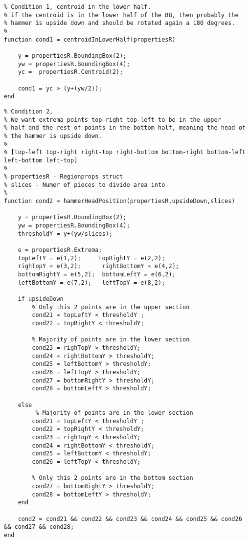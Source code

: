 \documentclass[es,gi]{ifirak}\usepackage[]{graphicx}\usepackage[]{color}
\begin{document}
\begin{lstlisting}
% Condition 1, centroid in the lower half.
% if the centroid is in the lower half of the BB, then probably the
% hammer is upside down and should be rotated again a 180 degrees.
%
function cond1 = centroidInLowerHalf(propertiesR)

    y = propertiesR.BoundingBox(2);
    yw = propertiesR.BoundingBox(4);
    yc =  propertiesR.Centroid(2);
    
    cond1 = yc > (y+(yw/2));
end

\end{lstlisting}

\begin{lstlisting}
% Condition 2,
% We want extrema points top-right top-left to be in the upper
% half and the rest of points in the bottom half, meaning the head of
% the hammer is upside down.
%
% [top-left top-right right-top right-bottom bottom-right bottom-left left-bottom left-top]
% 
% propertiesR - Regionprops struct
% slices - Numer of pieces to divide area into
% 
function cond2 = hammerHeadPosition(propertiesR,upsideDown,slices)
    
    y = propertiesR.BoundingBox(2);
    yw = propertiesR.BoundingBox(4);
    thresholdY = y+(yw/slices);
    
    e = propertiesR.Extrema;
    topLeftY = e(1,2);     topRightY = e(2,2);
    righTopY = e(3,2);      rightBottomY = e(4,2);
    bottomRightY = e(5,2);  bottomLeftY = e(6,2);
    leftBottomY = e(7,2);   leftTopY = e(8,2);
    
    if upsideDown
        % Only this 2 points are in the upper section
        cond21 = topLeftY < thresholdY ;
        cond22 = topRightY < thresholdY;

        % Majority of points are in the lower section
        cond23 = righTopY > thresholdY;
        cond24 = rightBottomY > thresholdY;
        cond25 = leftBottomY > thresholdY;
        cond26 = leftTopY > thresholdY;
        cond27 = bottomRightY > thresholdY;
        cond28 = bottomLeftY > thresholdY;
    
    else
         % Majority of points are in the lower section
        cond21 = topLeftY < thresholdY ;
        cond22 = topRightY < thresholdY;
        cond23 = righTopY < thresholdY;
        cond24 = rightBottomY < thresholdY;
        cond25 = leftBottomY < thresholdY;
        cond26 = leftTopY < thresholdY;
        
        % Only this 2 points are in the bottom section
        cond27 = bottomRightY > thresholdY;
        cond28 = bottomLeftY > thresholdY;
    end
    
    cond2 = cond21 && cond22 && cond23 && cond24 && cond25 && cond26 && cond27 && cond28;
end

\end{lstlisting}
\end{document}
